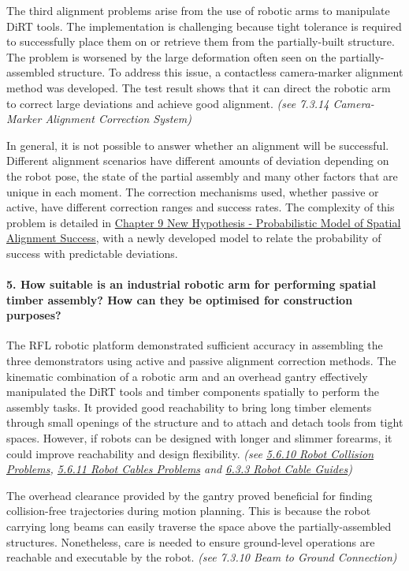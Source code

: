 The third alignment problems arise from the use of robotic arms to manipulate DiRT tools. The implementation is challenging because tight tolerance is required to successfully place them on or retrieve them from the partially-built structure. The problem is worsened by the large deformation often seen on the partially-assembled structure. To address this issue, a contactless camera-marker alignment method was developed. The test result shows that it can direct the robotic arm to correct large deviations and achieve good alignment. \textit{(see 7.3.14 Camera-Marker Alignment Correction System)}

In general, it is not possible to answer whether an alignment will be successful. Different alignment scenarios have different amounts of deviation depending on the robot pose, the state of the partial assembly and many other factors that are unique in each moment. The correction mechanisms used, whether passive or active, have different correction ranges and success rates. The complexity of this problem is detailed in \ul{Chapter 9 New Hypothesis - Probabilistic Model of Spatial Alignment Success}, with a newly developed model to relate the probability of success with predictable deviations.

\paragraph{5. How suitable is an industrial robotic arm for performing spatial timber assembly? How can they be optimised for construction purposes?}

The RFL robotic platform demonstrated sufficient accuracy in assembling the three demonstrators using active and passive alignment correction methods. The kinematic combination of a robotic arm and an overhead gantry effectively manipulated the DiRT tools and timber components spatially to perform the assembly tasks. It provided good reachability to bring long timber elements through small openings of the structure and to attach and detach tools from tight spaces. However, if robots can be designed with longer and slimmer forearms, it could improve reachability and design flexibility. \textit{(see \ul{5.6.10 Robot Collision Problems}, \ul{5.6.11 Robot Cables Problems} and \ul{6.3.3 Robot Cable Guides})}

The overhead clearance provided by the gantry proved beneficial for finding collision-free trajectories during motion planning. This is because the robot carrying long beams can easily traverse the space above the partially-assembled structures. Nonetheless, care is needed to ensure ground-level operations are reachable and executable by the robot. \textit{(see 7.3.10 Beam to Ground Connection)}

